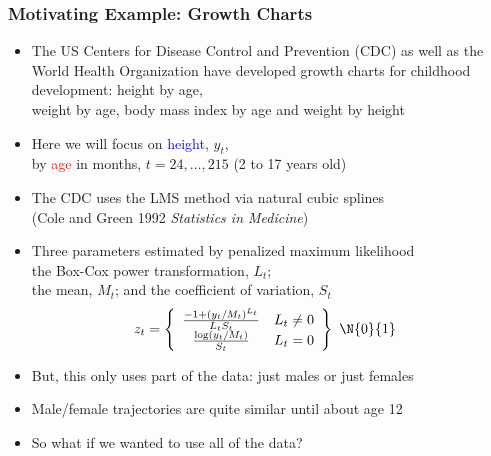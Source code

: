 \documentclass[11pt,dvipsnames,usenames,times]{beamer}
\begin{document}
\begin{frame}\frametitle{Motivating Example: Growth Charts}
\begin{itemize}
\item The US Centers for Disease Control and Prevention (CDC) as well
  as the World Health Organization have developed growth charts for
  childhood development: height by age,\\ weight by age, body mass
  index by age and weight by height
\item Here we will focus on \textcolor{blue}{height}, $y_t$,\\ 
by \textcolor{red}{age} in months, $t=24, \dots, 215$ (2 to 17 years old)
\item The CDC uses the LMS method via natural cubic splines \\
(Cole and Green 1992 {\it Statistics in Medicine})
\item Three parameters estimated by penalized maximum likelihood \\
the Box-Cox power transformation, $L_t$;\\ the mean, $M_t$; and
the coefficient of variation, $S_t$
\begin{align*}
z_t & = \left\{\begin{array}{cc} 
\frac{-1+(y_t/M_t)^{L_t}}{L_t S_t} & L_t \not= 0 \\
\frac{\log(y_t/M_t)}{S_t} &  L_t = 0 \end{array} 
\right\} ~\N{0}{1} 
\end{align*}
\item But, this only uses part of the data: just males or just females
\item Male/female 
trajectories are quite similar until about age 12
\item So what if we wanted to use all of the data? 
\end{itemize}
\end{frame}
\end{document}
